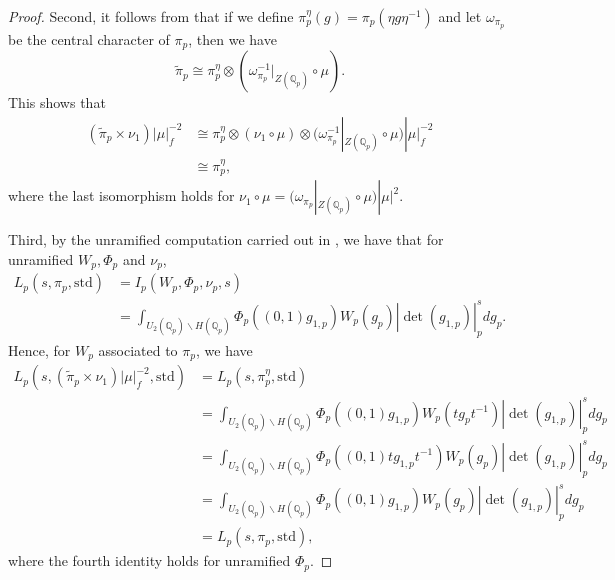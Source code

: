 \documentclass[11pt, a4paper]{amsart}
\theoremstyle{plain}
\theoremstyle{definition}
\numberwithin{equation}{section}
\def\QQ{\mathbb{Q}}
\newcommand{\Qp}{\QQ_p}
\begin{document}
\begin{proof}
    \par Second, it follows from \cite[Proposition 7.9]{PS18} that if we define $\pi_p^{\eta}(g) = \pi_p(\eta g \eta^{-1})$ and let $\omega_{\pi_p}$ be the central character of $\pi_p$, then we have 
        \begin{equation*}
            \tilde{\pi}_p \cong \pi_p^{\eta} \otimes (\omega_{\pi_p}^{-1}|_{Z(\Qp)} \circ \mu).
        \end{equation*}
        This shows that 
    \begin{align*}
        (\tilde{\pi}_p \times \nu_1) |\mu|_{f}^{-2} &\cong \pi_p^{\eta} \otimes (\nu_{1} \circ \mu)  \otimes (\omega_{\pi_p}^{-1}|_{Z(\Qp)} \circ \mu) |\mu|_{f}^{-2} \\  
            &\cong \pi_p^{\eta}, 
    \end{align*}
    where the last isomorphism holds for $\nu_1 \circ \mu = (\omega_{\pi_p}|_{Z(\Qp)} \circ \mu) |\mu|^{2}$. 
    \par Third, by the unramified computation carried out in \cite[\S 3.4 and \S 3.6]{PS18}, we have that for unramified $W_p, \Phi_p$ and $\nu_p$, 
    \begin{align*}
        L_{p}(s, \pi_p, \mathrm{std}) &= I_{p}(W_p, \Phi_p, \nu_p, s) \\ 
        &= \int_{U_{2}(\QQ_p) \backslash H(\QQ_p)}  \Phi_{p}((0,1)g_{1,p}) W_{p}(g_p) |\det(g_{1,p})|_{p}^{s}dg_{p}. 
    \end{align*}
    Hence, for $W_{p}$ associated to $\pi_{p}$, we have 
    \begin{align*}
        L_{p}(s, (\tilde{\pi}_p \times \nu_1) |\mu|_{f}^{-2}, \mathrm{std}) & = L_{p}(s, \pi_p^{\eta}, \mathrm{std}) \\
        & = \int_{U_{2}(\QQ_p) \backslash H(\QQ_p)}  \Phi_{p}((0,1)g_{1,p}) W_{p}(tg_pt^{-1}) |\det(g_{1,p})|_{p}^{s}dg_{p} \\ 
        & = \int_{U_{2}(\QQ_p) \backslash H(\QQ_p)}  \Phi_{p}((0,1)tg_{1,p}t^{-1}) W_{p}(g_p) |\det(g_{1,p})|_{p}^{s}dg_{p} \\
        & = \int_{U_{2}(\QQ_p) \backslash H(\QQ_p)}  \Phi_{p}((0,1)g_{1,p}) W_{p}(g_p) |\det(g_{1,p})|_{p}^{s}dg_{p} \\
        & = L_{p}(s, \pi_{p}, \mathrm{std}), 
    \end{align*}
    where the fourth identity holds for unramified $\Phi_{p}$. 
\end{proof}
\end{document}
